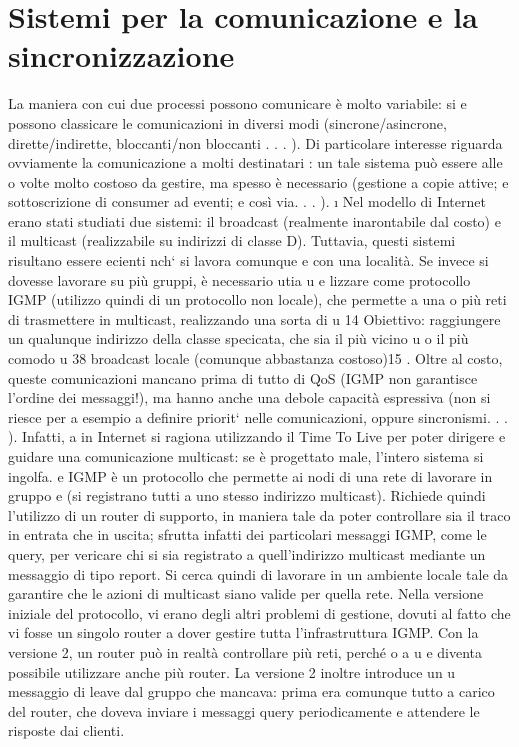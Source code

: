 \section{Sistemi per la comunicazione e la sincronizzazione}
La maniera con cui due processi possono comunicare è molto variabile: si
e
possono classicare le comunicazioni in diversi modi (sincrone/asincrone, dirette/indirette, bloccanti/non bloccanti . .
. ). Di particolare interesse riguarda
ovviamente la comunicazione a molti destinatari : un tale sistema può essere alle
o
volte molto costoso da gestire, ma spesso è necessario (gestione a copie attive;
e
sottoscrizione di consumer ad eventi; e così via. . . ).
\i{}
Nel modello di Internet erano stati studiati due sistemi: il broadcast (realmente inarontabile dal costo) e il multicast
(realizzabile su indirizzi di classe
D). Tuttavia, questi sistemi risultano essere ecienti nch` si lavora comunque
e
con una località. Se invece si dovesse lavorare su più gruppi, è necessario utia
u
e
lizzare come protocollo IGMP (utilizzo quindi di un protocollo non locale), che
permette a una o più reti di trasmettere in multicast, realizzando una sorta di
u
14 Obiettivo: raggiungere un qualunque indirizzo della classe specicata, che sia il più vicino
u
o il più comodo
u
38
broadcast locale (comunque abbastanza costoso)15 . Oltre al costo, queste comunicazioni mancano prima di tutto di QoS
(IGMP non garantisce l'ordine dei
messaggi!), ma hanno anche una debole capacità espressiva (non si riesce per
a
esempio a definire priorit` nelle comunicazioni, oppure sincronismi. . . ). Infatti,
a
in Internet si ragiona utilizzando il Time To Live per poter dirigere e guidare
una comunicazione multicast: se è progettato male, l'intero sistema si ingolfa.
e
IGMP è un protocollo che permette ai nodi di una rete di lavorare in gruppo
e
(si registrano tutti a uno stesso indirizzo multicast). Richiede quindi l'utilizzo
di un router di supporto, in maniera tale da poter controllare sia il traco in
entrata che in uscita; sfrutta infatti dei particolari messaggi IGMP, come le
query, per vericare chi si sia registrato a quell'indirizzo multicast mediante un
messaggio di tipo report. Si cerca quindi di lavorare in un ambiente locale tale
da garantire che le azioni di multicast siano valide per quella rete.
Nella versione iniziale del protocollo, vi erano degli altri problemi di gestione,
dovuti al fatto che vi fosse un singolo router a dover gestire tutta l'infrastruttura
IGMP. Con la versione 2, un router può in realtà controllare più reti, perché
o
a
u
e
diventa possibile utilizzare anche più router. La versione 2 inoltre introduce un
u
messaggio di leave dal gruppo che mancava: prima era comunque tutto a carico
del router, che doveva inviare i messaggi query periodicamente e attendere le
risposte dai clienti.
